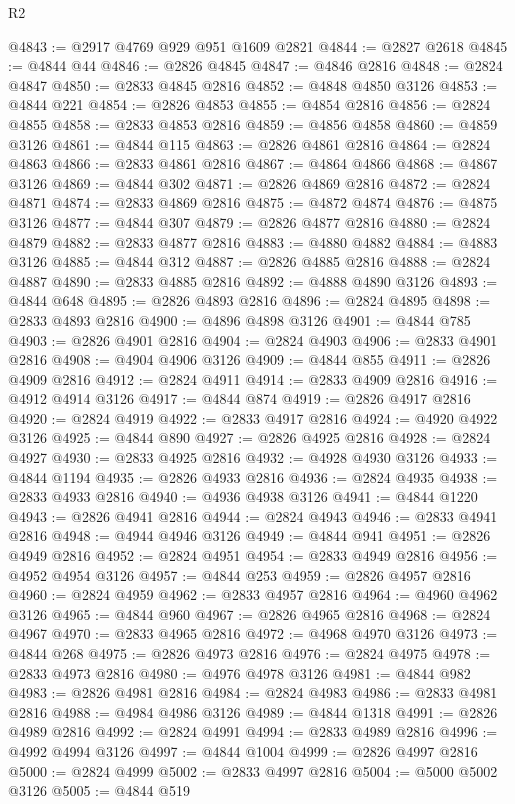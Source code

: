 \begin{lexlean}{R2}
\begin{coremodule}
@4843 := @2917 @4769 @929 @951 @1609 @2821
@4844 := @2827 @2618
@4845 := @4844 @44
@4846 := @2826 @4845
@4847 := @4846 @2816
@4848 := @2824 @4847
@4850 := @2833 @4845 @2816
@4852 := @4848 @4850 @3126
@4853 := @4844 @221
@4854 := @2826 @4853
@4855 := @4854 @2816
@4856 := @2824 @4855
@4858 := @2833 @4853 @2816
@4859 := @4856 @4858
@4860 := @4859 @3126
@4861 := @4844 @115
@4863 := @2826 @4861 @2816
@4864 := @2824 @4863
@4866 := @2833 @4861 @2816
@4867 := @4864 @4866
@4868 := @4867 @3126
@4869 := @4844 @302
@4871 := @2826 @4869 @2816
@4872 := @2824 @4871
@4874 := @2833 @4869 @2816
@4875 := @4872 @4874
@4876 := @4875 @3126
@4877 := @4844 @307
@4879 := @2826 @4877 @2816
@4880 := @2824 @4879
@4882 := @2833 @4877 @2816
@4883 := @4880 @4882
@4884 := @4883 @3126
@4885 := @4844 @312
@4887 := @2826 @4885 @2816
@4888 := @2824 @4887
@4890 := @2833 @4885 @2816
@4892 := @4888 @4890 @3126
@4893 := @4844 @648
@4895 := @2826 @4893 @2816
@4896 := @2824 @4895
@4898 := @2833 @4893 @2816
@4900 := @4896 @4898 @3126
@4901 := @4844 @785
@4903 := @2826 @4901 @2816
@4904 := @2824 @4903
@4906 := @2833 @4901 @2816
@4908 := @4904 @4906 @3126
@4909 := @4844 @855
@4911 := @2826 @4909 @2816
@4912 := @2824 @4911
@4914 := @2833 @4909 @2816
@4916 := @4912 @4914 @3126
@4917 := @4844 @874
@4919 := @2826 @4917 @2816
@4920 := @2824 @4919
@4922 := @2833 @4917 @2816
@4924 := @4920 @4922 @3126
@4925 := @4844 @890
@4927 := @2826 @4925 @2816
@4928 := @2824 @4927
@4930 := @2833 @4925 @2816
@4932 := @4928 @4930 @3126
@4933 := @4844 @1194
@4935 := @2826 @4933 @2816
@4936 := @2824 @4935
@4938 := @2833 @4933 @2816
@4940 := @4936 @4938 @3126
@4941 := @4844 @1220
@4943 := @2826 @4941 @2816
@4944 := @2824 @4943
@4946 := @2833 @4941 @2816
@4948 := @4944 @4946 @3126
@4949 := @4844 @941
@4951 := @2826 @4949 @2816
@4952 := @2824 @4951
@4954 := @2833 @4949 @2816
@4956 := @4952 @4954 @3126
@4957 := @4844 @253
@4959 := @2826 @4957 @2816
@4960 := @2824 @4959
@4962 := @2833 @4957 @2816
@4964 := @4960 @4962 @3126
@4965 := @4844 @960
@4967 := @2826 @4965 @2816
@4968 := @2824 @4967
@4970 := @2833 @4965 @2816
@4972 := @4968 @4970 @3126
@4973 := @4844 @268
@4975 := @2826 @4973 @2816
@4976 := @2824 @4975
@4978 := @2833 @4973 @2816
@4980 := @4976 @4978 @3126
@4981 := @4844 @982
@4983 := @2826 @4981 @2816
@4984 := @2824 @4983
@4986 := @2833 @4981 @2816
@4988 := @4984 @4986 @3126
@4989 := @4844 @1318
@4991 := @2826 @4989 @2816
@4992 := @2824 @4991
@4994 := @2833 @4989 @2816
@4996 := @4992 @4994 @3126
@4997 := @4844 @1004
@4999 := @2826 @4997 @2816
@5000 := @2824 @4999
@5002 := @2833 @4997 @2816
@5004 := @5000 @5002 @3126
@5005 := @4844 @519

\end{coremodule}
\end{lexlean}
